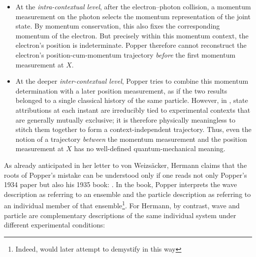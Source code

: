 \documentclass[pdflatex]{sn-jnl}
\newcommand{\vW}{von Weizsäcker\xspace}
\newcommand{\NGQ}[2]{\citep[#1/#2]{Hermann1935}}
\begin{document}
\begin{itemize}
\item At the \emph{intra-contextual level}, after the electron--photon collision, a momentum measurement on the photon selects the momentum representation of the joint state. By momentum conservation, this also fixes the corresponding momentum of the electron. But precisely within this momentum context, the electron's position is indeterminate. Popper therefore cannot reconstruct the electron's position-cum-momentum trajectory \emph{before} the first momentum measurement at $X$.

\item At the deeper \emph{inter-contextual level}, Popper tries to combine this momentum determination with a later position measurement, as if the two results belonged to a single classical history of the same particle. However, in \qm, state attributions at each instant are irreducibly tied to experimental contexts that are generally mutually exclusive; it is therefore physically meaningless to stitch them together to form a context-independent trajectory. Thus, even the notion of a trajectory \emph{between} the momentum measurement and the position measurement at $X$ has no well-defined quantum-mechanical meaning.
\end{itemize}
%
As already anticipated in her letter to \vW, Hermann claims that the roots of Popper's mistake can be understood only if one reads not only Popper's 1934 paper but also his 1935 book:  \NGQ{263}{123\fn{10}}. In the book, Popper interprets the wave description as referring to an ensemble  and the particle description as referring to an individual member of that ensemble\footnote{Indeed, \citet{Popper1936a} would later attempt to demystify  in this way}. For Hermann, by contrast, wave and particle are complementary descriptions of the same individual system under different experimental conditions:
\end{document}
